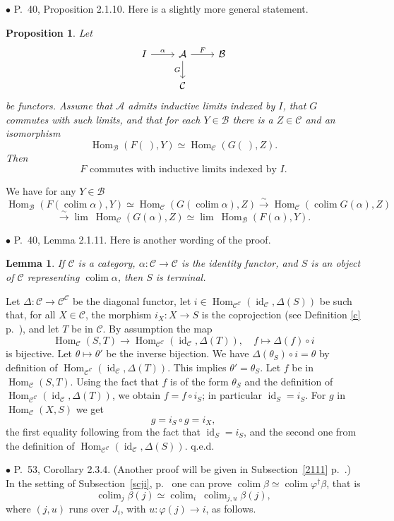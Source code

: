 \documentclass[12pt]{article}
\newtheorem{lem}[thm]{Lemma}
\newtheorem{prop}[thm]{Proposition}
\theoremstyle{remark}%
\newcommand{\bu}{\bullet}
\newcommand{\n}{\noindent}
\newcommand{\A}{\mathcal A}
\newcommand{\B}{\mathcal B}
\newcommand{\C}{\mathcal C}
\newcommand{\p}{\varphi}
\newcommand{\pf}{\n{\em Proof. }}
\newcommand{\be}{\begin{equation}}
\newcommand{\ee}{\end{equation}}
\newcommand{\bl}{\begin{lem}}
\newcommand{\el}{\end{lem}}
\newcommand{\bp}{\begin{prop}}
\newcommand{\ep}{\end{prop}}
\DeclareMathOperator*{\coli}{colim}
\DeclareMathOperator*{\co}{colim}
\DeclareMathOperator{\id}{id}
\DeclareMathOperator{\Hom}{Hom}
\DeclareMathOperator{\h}{Hom}
\begin{document}

\n$\bu$ P.~40, Proposition 2.1.10. Here is a slightly more general statement. 
%
\bp 
Let 
$$
\begin{tikzcd}
I\ar{r}{\alpha}&\A\ar{d}[swap]{G}\ar{r}{F}&\B\\
&\C
\end{tikzcd}
$$
be functors. Assume that $\A$ admits inductive limits indexed by $I$, that $G$ commutes with such limits, and that for each $Y\in\B$ there is a $Z\in\C$ and an isomorphism 
$$
\Hom_\B(F(\ ),Y)\simeq\Hom_\C(G(\ ),Z). 
$$
Then 
\begin{equation}\label{2.1.10}
F\text{ commutes with inductive limits indexed by }I.
\end{equation}
\ep
%
\pf We have for any $Y\in\B$ 
$$ 
\Hom_\B\left(F\left(\coli\alpha\right),Y\right)\simeq
\Hom_\C\left(G\left(\coli\alpha\right),Z\right)
\overset{\sim}{\to}
\Hom_\C\left(\coli G(\alpha),Z\right)
$$
$$
\overset{\sim}{\to}\lim \ \Hom_\C(G(\alpha),Z)\simeq\lim \ \Hom_\B(F(\alpha),Y).
$$  


\n$\bu$ P.~40, Lemma 2.1.11. Here is another wording of the proof. 
%
\bl 
If $\C$ is a category, $\alpha:\C\to\C$ is the identity functor, and $S$ is an object of $\C$ representing $\coli\alpha$, then $S$ is terminal. 
\el
%
\pf Let $\Delta:\C\to\C^\C$ be the diagonal functor, let $i\in\h_{\C^\C}(\id_\C,\Delta(S))$ be such that, for all $X\in\C$, the morphism $i_X:X\to S$ is the coprojection (see Definition \ref{c} p.~\pageref{c}), and let $T$ be in $\C$. By assumption the map 
$$
\h_\C(S,T)\to\h_{\C^\C}(\id_\C,\Delta(T)),\quad f\mapsto\Delta(f)\circ i 
$$ 
is bijective. Let $\theta\mapsto\theta'$ be the inverse bijection. We have $\Delta(\theta_S)\circ i=\theta$ by definition of $\h_{\C^\C}(\id_\C,\Delta(T))$. This implies $\theta'=\theta_S$. Let $f$ be in $\h_\C(S,T)$. Using the fact that $f$ is of the form $\theta_S$ and the definition of $\h_{\C^\C}(\id_\C,\Delta(T))$, we obtain $f=f\circ i_S$; in particular $\id_S=i_S$. For $g$ in $\h_\C(X,S)$ we get 
$$
g=i_S\circ g=i_X,
$$
the first equality following from the fact that $\id_S=i_S$, and the second one from the definition of $\h_{\C^\C}(\id_\C,\Delta(S))$. q.e.d. 


\n$\bu$ P.~53, Corollary 2.3.4. (Another proof will be given in Subsection~\ref{2111} p.~\pageref{2111}.) In the setting of Subsection~\ref{scji}, p.~\pageref{scji} one can prove $\co\beta\simeq\co\p^\dagger\beta$, that is 
%
\be\label{coco} 
\co_j\beta(j)\simeq\co_i\ \co_{j,u}\beta(j),  
\ee 
% 
where $(j,u)$ runs over $J_i$, with $u:\p(j)\to i$, as follows. 
\end{document}
